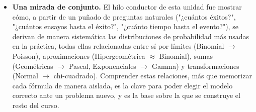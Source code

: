 \documentclass[11pt,a4paper]{article}
\theoremstyle{plain}
\theoremstyle{definition}
\theoremstyle{remark}
\begin{document}
\begin{itemize}
\item \textbf{Una mirada de conjunto.} El hilo conductor de esta unidad fue mostrar cómo, a partir de un puñado de preguntas naturales ("¿cuántos éxitos?", "¿cuántos ensayos hasta el éxito?", "¿cuánto tiempo hasta el evento?"), se derivan de manera sistemática las distribuciones de probabilidad más usadas en la práctica, todas ellas relacionadas entre sí por límites (Binomial $\to$ Poisson), aproximaciones (Hipergeométrica $\approx$ Binomial), sumas (Geométricas $\to$ Pascal, Exponenciales $\to$ Gamma) y transformaciones (Normal $\to$ chi-cuadrado). Comprender estas relaciones, más que memorizar cada fórmula de manera aislada, es la clave para poder elegir el modelo correcto ante un problema nuevo, y es la base sobre la que se construye el resto del curso.
\end{itemize}
\end{document}
